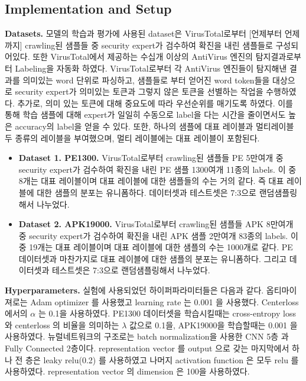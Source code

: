 \subsection{Implementation and Setup}
\textbf{Datasets. } 
모델의 학습과 평가에 사용된 dataset은 VirusTotal로부터 [언제부터 언제까지] crawling된 샘플들 중 security expert가 검수하여 확진을 내린 샘플들로 구성되어있다. 또한 VirusTotal에서 제공하는 수십개 이상의 AntiVirus 엔진의 탐지결과로부터 Labeling을 자동화 하였다. VirusTotal로부터 각 AntiVirus 엔진들이 탐지해낸 결과를 의미있는 word 단위로 파싱하고, 샘플들로 부터 얻어진 word token들을 대상으로 security expert가 의미있는 토큰과 그렇지 않은 토큰을 선별하는 작업을 수행하였다. 추가로, 의미 있는 토큰에 대해 중요도에 따라 우선순위를 매기도록 하였다. 이를 통해 학습 샘플에 대해 expert가 일일히 수동으로 label을 다는 시간을 줄이면서도 높은 accuracy의 label을 얻을 수 있다. 또한, 하나의 샘플에 대표 레이블과 멀티레이블 두 종류의 레이블을 부여했으며, 멀티 레이블에는 대표 레이블이 포함된다. 

\begin{itemize}
	\item{ \textbf{Dataset 1. PE1300. } VirusTotal로부터 crawling된 샘플들 PE 5만여개 중 security expert가 검수하여 확진을 내린 PE 샘플 1300여개 11종의 labels. 이 중 8개는 대표 레이블이며 대표 레이블에 대한 샘플들의 수는 거의 같다. 즉 대표 레이블에 대한 샘플의 분포는 유니폼하다. 데이터셋과 테스트셋은 7:3으로 랜덤샘플링해서 나누었다.
	}
	\item{ \textbf{Dataset 2. APK19000. } VirusTotal로부터 crawling된 샘플들 APK 8만여개 중 security expert가 검수하여 확진을 내린 APK 샘플 2만여개 83종의 labels. 이 중 19개는 대표 레이블이며 대표 레이블에 대한 샘플의 수는 1000개로 같다. PE 데이터셋과 마찬가지로 대표 레이블에 대한 샘플의 분포는 유니폼하다. 그리고 데이터셋과 테스트셋은 7:3으로 랜덤샘플링해서 나누었다.
	}
\end{itemize}

\textbf{Hyperparameters. }
실험에 사용되었던 하이퍼파라미터들은 다음과 같다. 옵티마이져로는 Adam optimizer 를 사용했고 learning rate 는 0.001 을 사용했다. Centerloss 에서의 $\alpha$ 는 0.1을 사용하였다. PE1300 데이터셋을 학습시킬때는 cross-entropy loss 와 centerloss 의 비율을 의미하는 $\lambda$ 값으로 0.1을, APK19000을 학습할때는 0.001 을 사용하였다. 뉴럴네트워크의 구조로는 batch normalization을 사용한 CNN 5층 과 Fully Connected 2층이다. representation vector 를 output 으로 갖는 마지막에서 하나 전 층은 leaky relu(0.2) 를 사용하였고 나머지 activation function 은 모두 relu 를 사용하였다. representation vector 의 dimension 은 100을 사용하였다. 

